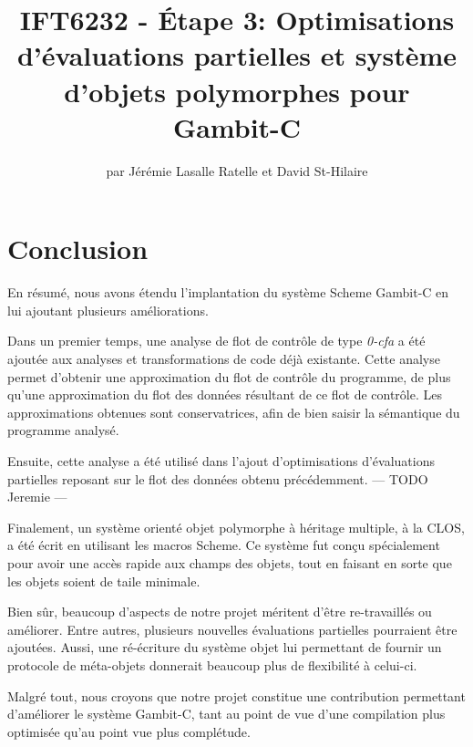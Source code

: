 \documentclass[letterpaper,12pt]{book}
\begin{document}
\title{IFT6232 - Étape 3: Optimisations d'évaluations partielles et
  système d'objets polymorphes pour Gambit-C}

\author{par Jérémie Lasalle Ratelle et David St-Hilaire}
\maketitle


\tableofcontents







\chapter{Conclusion}
  
  En résumé, nous avons étendu l'implantation du système Scheme
  Gambit-C en lui ajoutant plusieurs améliorations. 

  Dans un premier temps, une analyse de flot de contrôle de type
  \textit{0-cfa} a été ajoutée aux analyses et transformations de code
  déjà existante. Cette analyse permet d'obtenir une approximation du
  flot de contrôle du programme, de plus qu'une approximation du flot
  des données résultant de ce flot de contrôle. Les approximations
  obtenues sont conservatrices, afin de bien saisir la sémantique du
  programme analysé.

  Ensuite, cette analyse a été utilisé dans l'ajout d'optimisations
  d'évaluations partielles reposant sur le flot des données obtenu
  précédemment. --- TODO Jeremie ---

  Finalement, un système orienté objet polymorphe à héritage multiple,
  à la CLOS, a été écrit en utilisant les macros Scheme. Ce système
  fut conçu spécialement pour avoir une accès rapide aux champs des
  objets, tout en faisant en sorte que les objets soient de taile
  minimale. 

  Bien sûr, beaucoup d'aspects de notre projet méritent d'être
  re-travaillés ou améliorer. Entre autres, plusieurs nouvelles
  évaluations partielles pourraient être ajoutées. Aussi, une
  ré-écriture du système objet lui permettant de fournir un protocole
  de méta-objets donnerait beaucoup plus de flexibilité à celui-ci.

  Malgré tout, nous croyons que notre projet constitue une
  contribution permettant d'améliorer le système Gambit-C, tant au
  point de vue d'une compilation plus optimisée qu'au point vue plus
  complétude.





\end{document}
